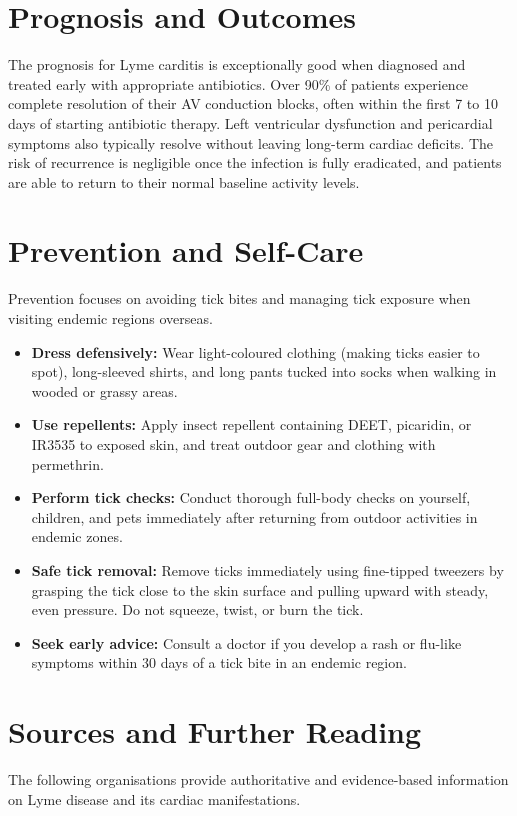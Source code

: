 \section*{Prognosis and Outcomes}
The prognosis for Lyme carditis is exceptionally good when diagnosed and treated early with appropriate antibiotics. Over 90\% of patients experience complete resolution of their AV conduction blocks, often within the first 7 to 10 days of starting antibiotic therapy. Left ventricular dysfunction and pericardial symptoms also typically resolve without leaving long-term cardiac deficits. The risk of recurrence is negligible once the infection is fully eradicated, and patients are able to return to their normal baseline activity levels.

\section*{Prevention and Self-Care}
Prevention focuses on avoiding tick bites and managing tick exposure when visiting endemic regions overseas.

\begin{itemize}
    \item \textbf{Dress defensively:} Wear light-coloured clothing (making ticks easier to spot), long-sleeved shirts, and long pants tucked into socks when walking in wooded or grassy areas.
    \item \textbf{Use repellents:} Apply insect repellent containing DEET, picaridin, or IR3535 to exposed skin, and treat outdoor gear and clothing with permethrin.
    \item \textbf{Perform tick checks:} Conduct thorough full-body checks on yourself, children, and pets immediately after returning from outdoor activities in endemic zones.
    \item \textbf{Safe tick removal:} Remove ticks immediately using fine-tipped tweezers by grasping the tick close to the skin surface and pulling upward with steady, even pressure. Do not squeeze, twist, or burn the tick.
    \item \textbf{Seek early advice:} Consult a doctor if you develop a rash or flu-like symptoms within 30 days of a tick bite in an endemic region.
\end{itemize}

\section*{Sources and Further Reading}
The following organisations provide authoritative and evidence-based information on Lyme disease and its cardiac manifestations.

